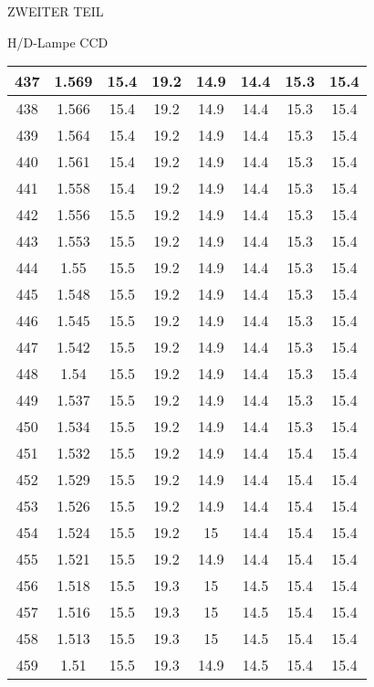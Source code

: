 \begin{appendix}
\begin{chapter}{ZWEITER TEIL}
\begin{section}{H/D-Lampe CCD}
\begin{scriptsize}
\begin{longtable}[htbp]{|c|c|c|c|c|c|c|c|}
            437 & 1.569 & 15.4 & 19.2 & 14.9 & 14.4 & 15.3 & 15.4 \\ \hline
            438 & 1.566 & 15.4 & 19.2 & 14.9 & 14.4 & 15.3 & 15.4 \\ \hline
            439 & 1.564 & 15.4 & 19.2 & 14.9 & 14.4 & 15.3 & 15.4 \\ \hline
            440 & 1.561 & 15.4 & 19.2 & 14.9 & 14.4 & 15.3 & 15.4 \\ \hline
            441 & 1.558 & 15.4 & 19.2 & 14.9 & 14.4 & 15.3 & 15.4 \\ \hline
            442 & 1.556 & 15.5 & 19.2 & 14.9 & 14.4 & 15.3 & 15.4 \\ \hline
            443 & 1.553 & 15.5 & 19.2 & 14.9 & 14.4 & 15.3 & 15.4 \\ \hline
            444 & 1.55 & 15.5 & 19.2 & 14.9 & 14.4 & 15.3 & 15.4 \\ \hline
            445 & 1.548 & 15.5 & 19.2 & 14.9 & 14.4 & 15.3 & 15.4 \\ \hline
            446 & 1.545 & 15.5 & 19.2 & 14.9 & 14.4 & 15.3 & 15.4 \\ \hline
            447 & 1.542 & 15.5 & 19.2 & 14.9 & 14.4 & 15.3 & 15.4 \\ \hline
            448 & 1.54 & 15.5 & 19.2 & 14.9 & 14.4 & 15.3 & 15.4 \\ \hline
            449 & 1.537 & 15.5 & 19.2 & 14.9 & 14.4 & 15.3 & 15.4 \\ \hline
            450 & 1.534 & 15.5 & 19.2 & 14.9 & 14.4 & 15.3 & 15.4 \\ \hline
            451 & 1.532 & 15.5 & 19.2 & 14.9 & 14.4 & 15.4 & 15.4 \\ \hline
            452 & 1.529 & 15.5 & 19.2 & 14.9 & 14.4 & 15.4 & 15.4 \\ \hline
            453 & 1.526 & 15.5 & 19.2 & 14.9 & 14.4 & 15.4 & 15.4 \\ \hline
            454 & 1.524 & 15.5 & 19.2 & 15 & 14.4 & 15.4 & 15.4 \\ \hline
            455 & 1.521 & 15.5 & 19.2 & 14.9 & 14.4 & 15.4 & 15.4 \\ \hline
            456 & 1.518 & 15.5 & 19.3 & 15 & 14.5 & 15.4 & 15.4 \\ \hline
            457 & 1.516 & 15.5 & 19.3 & 15 & 14.5 & 15.4 & 15.4 \\ \hline
            458 & 1.513 & 15.5 & 19.3 & 15 & 14.5 & 15.4 & 15.4 \\ \hline
            459 & 1.51 & 15.5 & 19.3 & 14.9 & 14.5 & 15.4 & 15.4 \\ \hline

\end{longtable}
\end{scriptsize}
\end{section}
\end{chapter}
\end{appendix}

